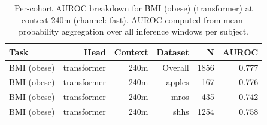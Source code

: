 \begin{table}[ht]
\centering
\caption{Per-cohort AUROC breakdown for BMI (obese) (transformer) at context 240m (channel: fast). AUROC computed from mean-probability aggregation over all inference windows per subject.}
\label{tab:cohort_bmi_binary_transformer_fast}
\begin{tabular}{lrrrrr}
\toprule
Task & Head & Context & Dataset & N & AUROC \\
\midrule
BMI (obese) & transformer & 240m & Overall & 1856 & 0.777 \\
BMI (obese) & transformer & 240m & apples & 167 & 0.776 \\
BMI (obese) & transformer & 240m & mros & 435 & 0.742 \\
BMI (obese) & transformer & 240m & shhs & 1254 & 0.758 \\
\bottomrule
\end{tabular}
\end{table}
